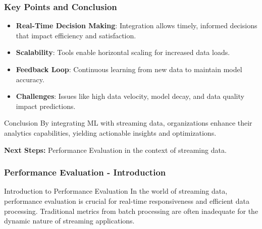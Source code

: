\documentclass[aspectratio=169]{beamer}
\begin{document}
\begin{frame}
    \frametitle{Key Points and Conclusion}
    \begin{itemize}
        \item \textbf{Real-Time Decision Making}: Integration allows timely, informed decisions that impact efficiency and satisfaction.
        \item \textbf{Scalability}: Tools enable horizontal scaling for increased data loads.
        \item \textbf{Feedback Loop}: Continuous learning from new data to maintain model accuracy.
        \item \textbf{Challenges}: Issues like high data velocity, model decay, and data quality impact predictions.
    \end{itemize}

    \begin{block}{Conclusion}
        By integrating ML with streaming data, organizations enhance their analytics capabilities, yielding actionable insights and optimizations.
    \end{block}
    
    \textbf{Next Steps:} Performance Evaluation in the context of streaming data.
\end{frame}

\begin{frame}[fragile]
    \frametitle{Performance Evaluation - Introduction}
    \begin{block}{Introduction to Performance Evaluation}
        In the world of streaming data, performance evaluation is crucial for real-time responsiveness and efficient data processing. Traditional metrics from batch processing are often inadequate for the dynamic nature of streaming applications.
    \end{block}
\end{frame}
\end{document}
